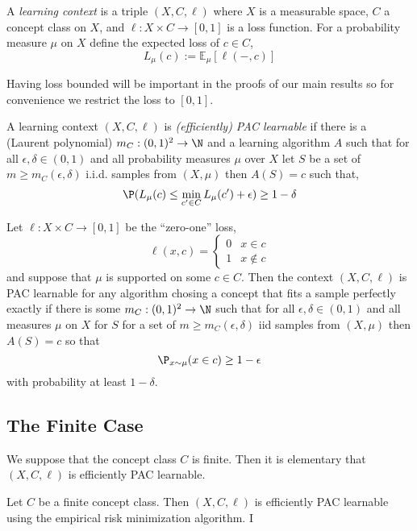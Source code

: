 \documentclass[12pt]{article}
\renewcommand{\E}{\mathbb{E}}
\begin{document}
\begin{defn}
A \textit{learning context} is a triple $(X, C, \ell)$ where $X$ is a measurable space, $C$ a concept class on $X$, and $\ell : X \times C \to [0,1]$ is a loss function. For a probability measure $\mu$ on $X$ define the expected loss of $c \in C$,
\[ L_\mu(c) := \E_\mu[\ell(-,c)] \]
\end{defn}

\begin{rmk}
Having loss bounded will be important in the proofs of our main results so for convenience we restrict the loss to $[0,1]$.
\end{rmk}

\begin{defn}
A learning context $(X, C, \ell)$ is \textit{(efficiently) PAC learnable} if there is a (Laurent polynomial) $m_C : (0,1)^2 \to \N$ and a learning algorithm $A$ such that for all $\epsilon, \delta \in (0,1)$ and all probability measures $\mu$ over $X$ let $S$ be a set of $m \ge m_C(\epsilon, \delta)$ i.i.d. samples from $(X, \mu)$ then $A(S) = c$ such that,
\[ \P(L_\mu(c) \le \min_{c' \in C} L_\mu(c') + \epsilon) \ge 1 - \delta \]
\end{defn}

\begin{example}
Let $\ell : X \times C \to [0,1]$ be the ``zero-one'' loss,
\[ \ell(x, c) = 
\begin{cases}
0 & x \in c
\\
1 & x \notin c
\end{cases} \]
and suppose that $\mu$ is supported on some $c \in C$. Then the context $(X, C, \ell)$ is PAC learnable for any algorithm chosing a concept that fits a sample perfectly exactly if there is some $m_C : (0,1)^2 \to \N$ such that for all $\epsilon, \delta \in (0,1)$ and all measures $\mu$ on $X$ for $S$ for a set of $m \ge m_C(\epsilon, \delta)$ iid samples from $(X, \mu)$ then $A(S) = c$ so that
\[ \P_{x \sim \mu}(x \in c) \ge 1 - \epsilon \]
with probability at least $1 - \delta$.
\end{example}

\subsection{The Finite Case}

We suppose that the concept class $C$ is finite. Then it is elementary that $(X, C, \ell)$ is efficiently PAC learnable.

\begin{theorem}
Let $C$ be a finite concept class. Then $(X, C, \ell)$ is efficiently PAC learnable using the empirical risk minimization algorithm. I
\end{theorem}
\end{document}
